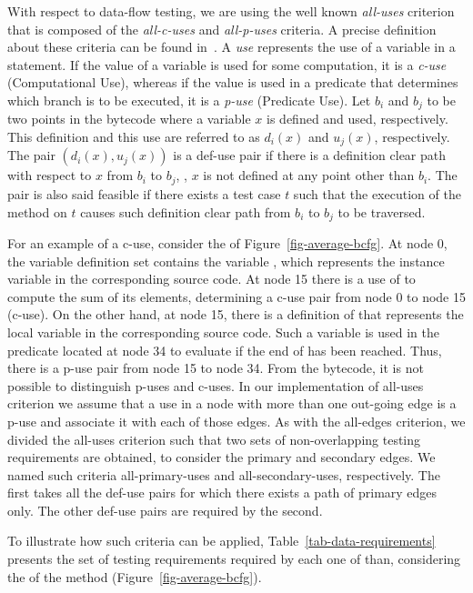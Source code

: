 With respect to data-flow testing, we are using the well known
\emph{all-uses} criterion~\cite{Rapps85SSTD} that is composed of
the \emph{all-c-uses} and \emph{all-p-uses} criteria. A precise
definition about these criteria can be found
in~\cite{Rapps85SSTD}. A {\em use} represents the use of a
variable in a statement. If the value of a variable is used for
some computation, it is a {\em c-use} (Computational Use), whereas
if the value is used in a predicate that determines which branch
is to be executed, it is a {\em p-use} (Predicate Use). Let $b_i$
and $b_j$ to be two points in the bytecode where a variable $x$ is
defined and used, respectively. This definition and this use are
referred to as $d_i(x)$ and $u_j(x)$, respectively. The pair
$(d_i(x), u_j(x))$ is a def-use pair if there is a definition
clear path with respect to $x$ from $b_i$ to $b_j$, \ie, $x$ is
not defined at any point other than $b_i$. The pair is also said
feasible if there exists a test case $t$ such that the execution
of the method on $t$ causes such definition clear path from $b_i$
to $b_j$ to be traversed.

For an example of a c-use, consider the \DUG of
Figure~\ref{fig-average-bcfg}. At node 0, the variable definition
set contains the variable , which represents the
instance variable  in the corresponding source code. At
node 15 there is a use of  to compute the sum of its
elements, determining a c-use pair \wrt {} from node 0 to
node 15 (c-use). On the other hand, at node 15, there is a
definition of  that represents the local variable 
in the corresponding source code. Such a variable is used in the
predicate located at node 34 to evaluate if the end of  has
been reached. Thus, there is a p-use pair \wrt {} from node
15 to node 34. From the bytecode, it is not possible to
distinguish p-uses and c-uses. In our implementation of all-uses
criterion we assume that a use in a node with more than one
out-going edge is a p-use and associate it with each of those
edges. As with the all-edges criterion, we divided the all-uses
criterion such that two sets of non-overlapping testing
requirements are obtained, to consider the primary and secondary
edges. We named such criteria all-primary-uses and
all-secondary-uses, respectively. The first takes all the def-use
pairs for which there exists a path of primary edges only. The
other def-use pairs are required by the second.

To illustrate how such criteria can be applied,
Table~\ref{tab-data-requirements} presents the set of testing
requirements required by each one of than, considering the \BG of
the method  (Figure~\ref{fig-average-bcfg}).

